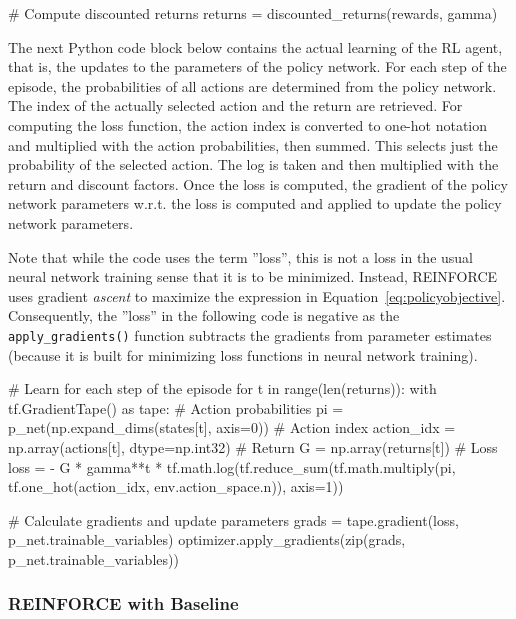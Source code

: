 \begin{withcode}
\begin{pythoncode}
    # Compute discounted returns
    returns = discounted_returns(rewards, gamma)
\end{pythoncode}

The next Python code block below contains the actual learning of the RL agent, that is, the updates to the parameters of the policy network. For each step of the episode, the probabilities of all actions are determined from the policy network. The index of the actually selected action and the return are retrieved. For computing the loss function, the action index is converted to one-hot notation and multiplied with the action probabilities, then summed. This selects just the probability of the selected action. The log is taken and then multiplied with the return and discount factors. Once the loss is computed, the gradient of the policy network parameters w.r.t. the loss is computed and applied to update the policy network parameters. 

Note that while the code uses the term ''loss'', this is not a loss in the usual neural network training sense that it is to be minimized. Instead, REINFORCE uses gradient \emph{ascent} to maximize the expression in Equation~\ref{eq:policyobjective}. Consequently, the ''loss'' in the following code is negative as the \texttt{apply\_gradients()} function subtracts the gradients from parameter estimates (because it is built for minimizing loss functions in neural network training).

\begin{pythoncode}
    # Learn for each step of the episode
    for t in range(len(returns)):
        with tf.GradientTape() as tape:
            # Action probabilities
            pi = p_net(np.expand_dims(states[t], axis=0))
            # Action index
            action_idx = np.array(actions[t], dtype=np.int32)
            # Return
            G = np.array(returns[t])
            # Loss
            loss = - G * gamma**t * 
                tf.math.log(tf.reduce_sum(tf.math.multiply(pi, 
                    tf.one_hot(action_idx, env.action_space.n)), 
                    axis=1))

        # Calculate gradients and update parameters
        grads = tape.gradient(loss, p_net.trainable_variables)
        optimizer.apply_gradients(zip(grads, p_net.trainable_variables))
\end{pythoncode}
\end{withcode}

\subsubsection*{REINFORCE with Baseline}

